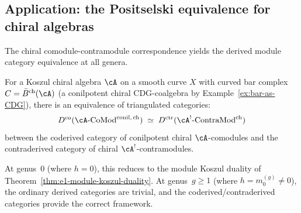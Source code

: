 \subsection{Application: the Positselski equivalence for chiral algebras}
\label{subsec:positselski-chiral-equivalence}

The chiral comodule-contramodule correspondence yields the derived module category equivalence at all genera.

\begin{theorem}
\label{thm:positselski-chiral-proved}
For a Koszul chiral algebra $\cA$ on a smooth curve $X$ with
curved bar complex $C = \bar{B}^{\mathrm{ch}}(\cA)$
(a conilpotent chiral CDG-coalgebra by
Example~\textup{\ref{ex:bar-as-CDG}}), there is an equivalence of
triangulated categories:
\begin{equation}\label{eq:positselski-chiral-proved}
D^{\mathrm{co}}(\cA\text{-}\mathrm{CoMod}^{\mathrm{conil,\,ch}})
\;\simeq\;
D^{\mathrm{ctr}}(\cA^!\text{-}\mathrm{ContraMod}^{\mathrm{ch}})
\end{equation}
between the coderived category of conilpotent chiral
$\cA$-comodules and the contraderived category of chiral
$\cA^!$-contramodules.

At genus~$0$ (where $h = 0$), this reduces to the module Koszul
duality of
Theorem~\textup{\ref{thm:e1-module-koszul-duality}}.
At genus~$g \geq 1$ (where $h = m_0^{(g)} \neq 0$), the ordinary
derived categories are trivial, and the coderived/contraderived
categories provide the correct framework.
\end{theorem}

